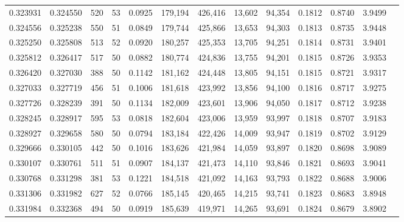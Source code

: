 \begin{tabular}{rrrrrrrrrrrrr}
0.323931 & 0.324550 &   520 &  53 &                                     0.0925 & 179,194 & 426,416 &  13,602 &  94,354 & 0.1812 & 0.8740 & 3.9499 \\
0.324556 & 0.325238 &   550 &  51 &                                     0.0849 & 179,744 & 425,866 &  13,653 &  94,303 & 0.1813 & 0.8735 & 3.9448 \\
0.325250 & 0.325808 &   513 &  52 &                                     0.0920 & 180,257 & 425,353 &  13,705 &  94,251 & 0.1814 & 0.8731 & 3.9401 \\
0.325812 & 0.326417 &   517 &  50 &                                     0.0882 & 180,774 & 424,836 &  13,755 &  94,201 & 0.1815 & 0.8726 & 3.9353 \\
0.326420 & 0.327030 &   388 &  50 &                                     0.1142 & 181,162 & 424,448 &  13,805 &  94,151 & 0.1815 & 0.8721 & 3.9317 \\
0.327033 & 0.327719 &   456 &  51 &                                     0.1006 & 181,618 & 423,992 &  13,856 &  94,100 & 0.1816 & 0.8717 & 3.9275 \\
0.327726 & 0.328239 &   391 &  50 &                                     0.1134 & 182,009 & 423,601 &  13,906 &  94,050 & 0.1817 & 0.8712 & 3.9238 \\
0.328245 & 0.328917 &   595 &  53 &                                     0.0818 & 182,604 & 423,006 &  13,959 &  93,997 & 0.1818 & 0.8707 & 3.9183 \\
0.328927 & 0.329658 &   580 &  50 &                                     0.0794 & 183,184 & 422,426 &  14,009 &  93,947 & 0.1819 & 0.8702 & 3.9129 \\
0.329666 & 0.330105 &   442 &  50 &                                     0.1016 & 183,626 & 421,984 &  14,059 &  93,897 & 0.1820 & 0.8698 & 3.9089 \\
0.330107 & 0.330761 &   511 &  51 &                                     0.0907 & 184,137 & 421,473 &  14,110 &  93,846 & 0.1821 & 0.8693 & 3.9041 \\
0.330768 & 0.331298 &   381 &  53 &                                     0.1221 & 184,518 & 421,092 &  14,163 &  93,793 & 0.1822 & 0.8688 & 3.9006 \\
0.331306 & 0.331982 &   627 &  52 &                                     0.0766 & 185,145 & 420,465 &  14,215 &  93,741 & 0.1823 & 0.8683 & 3.8948 \\
0.331984 & 0.332368 &   494 &  50 &                                     0.0919 & 185,639 & 419,971 &  14,265 &  93,691 & 0.1824 & 0.8679 & 3.8902 \\

\end{tabular}
